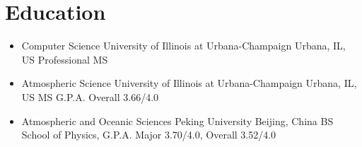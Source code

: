 \documentclass[11pt,a4paper,sans]{moderncv}        %
\begin{document}
\makecvtitle

\vspace{-50pt}
\section{Education}
\begin{itemize}
	\item {
	      {Computer Science}
	      {University of Illinois at Urbana-Champaign}
	      {Urbana, IL, US}
	      {Professional MS}
	      {}
	      }
	      
	\item {
	      {Atmospheric Science}
	      {University of Illinois at Urbana-Champaign}
	      {Urbana, IL, US}
	      {MS}
	      {G.P.A. Overall 3.66/4.0}
	      }
	      
	\item {
	      {Atmospheric and Oceanic Sciences}
	      {Peking University}
	      {Beijing, China}
	      {BS}
	      {School of Physics, G.P.A. Major 3.70/4.0, Overall 3.52/4.0}
	      }
\end{itemize}
\end{document}
